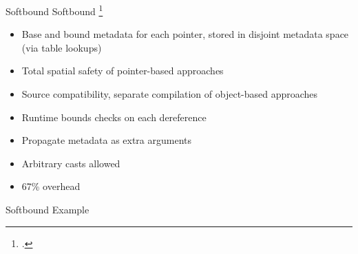 \documentclass[aspectratio=169]{beamer}
\begin{document}
\begin{frame}{Softbound}
\footnotesize
Softbound \footcite{nagarakatte_softbound:_2009}
    \begin{itemize}
        \item Base and bound metadata for each pointer, stored in disjoint metadata space (via table lookups) 
        \item Total spatial safety of pointer-based approaches 
        \item Source compatibility, separate compilation of object-based approaches
        \item Runtime bounds checks on each dereference
        \item Propagate metadata as extra arguments 
        \item Arbitrary casts allowed 
        \item 67\% overhead
    \end{itemize}
\end{frame}

\begin{frame}{Softbound Example}
\end{frame}

\end{document}

